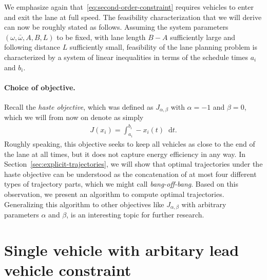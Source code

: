 \documentclass[a4paper]{report}
\theoremstyle{definition}
\theoremstyle{plain}
\newcommand*\diff{\mathop{}\!\mathrm{d}}
\begin{document}
We emphasize again that~\eqref{eq:second-order-constraint} requires vehicles to
enter and exit the lane at full speed.
%
The feasibility characterization that we will derive can now be roughly stated
as follows. Assuming the system parameters $(\omega, \bar{\omega},A,B,L)$ to be
fixed, with lane length $B-A$ sufficiently large and following distance $L$
sufficiently small, feasibility of the lane planning problem is characterized by
a system of linear inequalities in terms of the schedule times $a_{i}$ and
$b_{i}$.

\paragraph{Choice of objective.}
Recall the \emph{haste objective}, which was defined as $J_{\alpha,\beta}$ with $\alpha=-1$ and $\beta=0$, which we will from now on denote as simply
\begin{align}\label{eq:haste-objective}
  J(x_{i}) = \int_{a_{i}}^{b_{i}} - x_{i}(t) \diff t .
\end{align}
%
Roughly speaking, this objective seeks to keep all vehicles as close to the end
of the lane at all times, but it does not capture energy efficiency in any way.
%
In Section~\ref{sec:explicit-trajectories}, we will show that optimal
trajectories under the haste objective can be understood as the concatenation of
at most four different types of trajectory parts, which we might call
\emph{bang-off-bang}. Based on this observation, we present an algorithm to compute
optimal trajectories.
%
Generalizing this algorithm to other objectives like $J_{\alpha,\beta}$ with
arbitrary parameters $\alpha$ and $\beta$, is an interesting topic for further research.



\section{Single vehicle with arbitary lead vehicle constraint}\label{sec:single-vehicle-problem}
\end{document}
